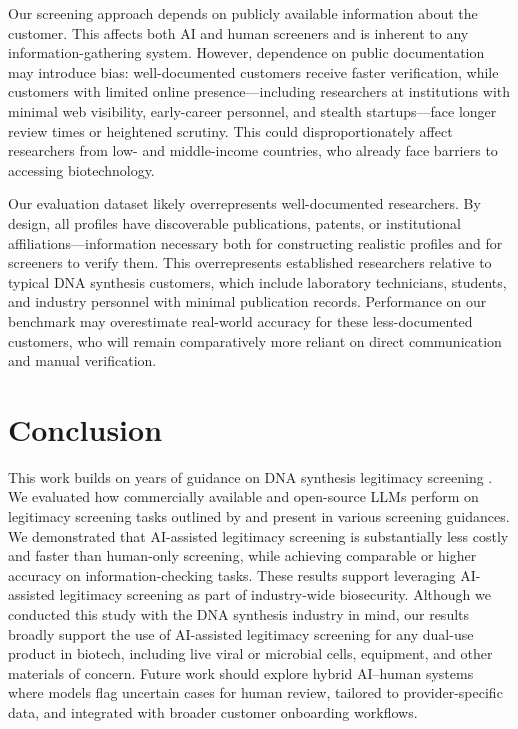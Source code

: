 \documentclass[utf8]{FrontiersinHarvard}
\begin{document}
Our screening approach depends on publicly available information about the customer. This affects both AI and human screeners and is inherent to any information-gathering system. However, dependence on public documentation may introduce bias: well-documented customers receive faster verification, while customers with limited online presence---including researchers at institutions with minimal web visibility, early-career personnel, and stealth startups---face longer review times or heightened scrutiny. This could disproportionately affect researchers from low- and middle-income countries, who already face barriers to accessing biotechnology.

Our evaluation dataset likely overrepresents well-documented researchers. By design, all profiles have discoverable publications, patents, or institutional affiliations---information necessary both for constructing realistic profiles and for screeners to verify them. This overrepresents established researchers relative to typical DNA synthesis customers, which include laboratory technicians, students, and industry personnel with minimal publication records. Performance on our benchmark may overestimate real-world accuracy for these less-documented customers, who will remain comparatively more reliant on direct communication and manual verification.

\section{Conclusion}

This work builds on years of guidance on DNA synthesis legitimacy screening \citep{CarterFriedman2015, Alexanian2024, IGSC2024}. We evaluated how commercially available and open-source LLMs perform on legitimacy screening tasks outlined by \citet{Alexanian2024} and present in various screening guidances. We demonstrated that AI-assisted legitimacy screening is substantially less costly and faster than human-only screening, while achieving comparable or higher accuracy on information-checking tasks. These results support leveraging AI-assisted legitimacy screening as part of industry-wide biosecurity. Although we conducted this study with the DNA synthesis industry in mind, our results broadly support the use of AI-assisted legitimacy screening for any dual-use product in biotech, including live viral or microbial cells, equipment, and other materials of concern. Future work should explore hybrid AI--human systems where models flag uncertain cases for human review, tailored to provider-specific data, and integrated with broader customer onboarding workflows.
\end{document}

